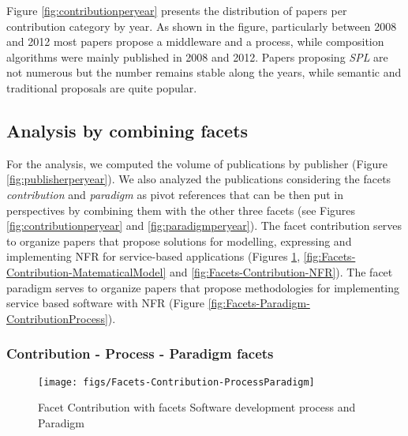 Figure \ref{fig:contributionperyear} presents the distribution of papers per
contribution category by year. As shown in the figure, particularly between 2008 and 2012 most papers propose a middleware and a process, while composition algorithms were mainly published in 2008 and 2012. Papers proposing \textit{SPL} are not numerous but the number remains stable along the years, while semantic and traditional proposals are quite popular.

 
\subsection{Analysis by combining facets}
For the analysis, we computed the
volume of publications by publisher (Figure \ref{fig:publisherperyear}). We
also analyzed the publications considering the facets 
{\em contribution} and {\em paradigm} as pivot references that can be then put in perspectives by combining them with the other three facets (see Figures \ref{fig:contributionperyear} and
\ref{fig:paradigmperyear}).
The facet contribution   serves to organize papers that propose solutions for modelling, expressing and implementing NFR for service-based applications (Figures
\ref{fig:Facets-Contribution-ProcessParadigm}, 
\ref{fig:Facets-Contribution-MatematicalModel} and
\ref{fig:Facets-Contribution-NFR}). The facet paradigm serves to organize papers that propose methodologies for implementing service based software with  NFR (Figure \ref{fig:Facets-Paradigm-ContributionProcess}). 

\subsubsection{Contribution - Process - Paradigm facets}
\begin{figure} [htpb]
\centering
\texttt{[image: figs/Facets-Contribution-ProcessParadigm]}
\caption{Facet Contribution with facets Software development process and Paradigm }
\label{fig:Facets-Contribution-ProcessParadigm}
\end{figure}   

